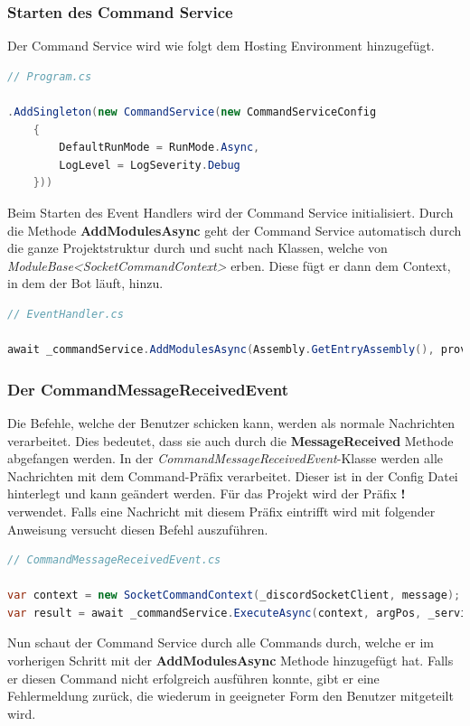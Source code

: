 \documentclass[a4paper, table]{article}
\begin{document}
\subsubsection*{Starten des Command Service}
Der Command Service wird wie folgt dem Hosting Environment hinzugefügt.

\begin{lstlisting}[language=csharp]
// Program.cs

.AddSingleton(new CommandService(new CommandServiceConfig
    {
        DefaultRunMode = RunMode.Async,
        LogLevel = LogSeverity.Debug
    }))
\end{lstlisting}

Beim Starten des Event Handlers wird der Command Service initialisiert.
Durch die Methode \textbf{AddModulesAsync} geht der Command Service automatisch durch die ganze Projektstruktur durch und 
sucht nach Klassen, welche von \textit{ModuleBase<SocketCommandContext>} erben. 
Diese fügt er dann dem Context, in dem der Bot läuft, hinzu.

\begin{lstlisting}[language=csharp]
// EventHandler.cs

await _commandService.AddModulesAsync(Assembly.GetEntryAssembly(), provider);
\end{lstlisting}

\subsubsection*{Der CommandMessageReceivedEvent}
Die Befehle, welche der Benutzer schicken kann, werden als normale Nachrichten verarbeitet.
Dies bedeutet, dass sie auch durch die \textbf{MessageReceived} Methode abgefangen werden.
In der \textit{CommandMessageReceivedEvent}-Klasse werden alle Nachrichten mit dem Command-Präfix verarbeitet.
Dieser ist in der Config Datei hinterlegt und kann geändert werden.
Für das Projekt wird der Präfix \textbf{!} verwendet.
Falls eine Nachricht mit diesem Präfix eintrifft wird mit folgender Anweisung versucht diesen Befehl auszuführen.

\begin{lstlisting}[language=csharp]
// CommandMessageReceivedEvent.cs

var context = new SocketCommandContext(_discordSocketClient, message);
var result = await _commandService.ExecuteAsync(context, argPos, _serviceProvider);
\end{lstlisting}

Nun schaut der Command Service durch alle Commands durch, 
welche er im vorherigen Schritt mit der \textbf{AddModulesAsync} Methode hinzugefügt hat.
Falls er diesen Command nicht erfolgreich ausführen konnte, gibt er eine Fehlermeldung zurück, 
die wiederum in geeigneter Form den Benutzer mitgeteilt wird.
\end{document}
